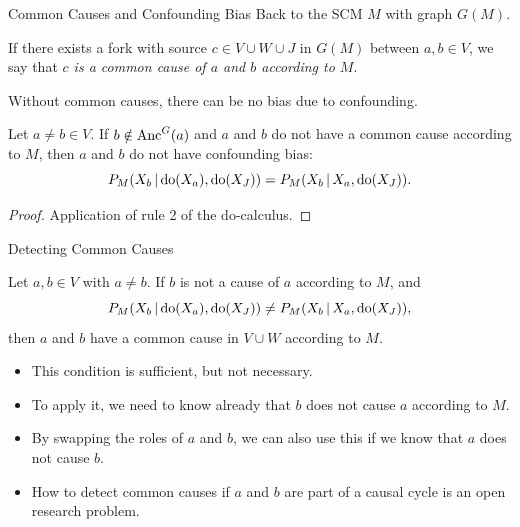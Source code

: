 \begin{frame}{Common Causes and Confounding Bias}
Back to the SCM $M$ with graph $G(M)$.
\begin{Def}
  If there exists a fork with source $c \in V \cup W \cup J$ in $G(M)$ between $a,b \in V$, we say that \emph{$c$ is a common cause of $a$ and $b$ according to $M$}.
\end{Def}
Without common causes, there can be no bias due to confounding.
\begin{Prp}\label{prp:scm_confounded_separation}
Let $a \ne b \in V$.
If $b \notin \mathrm{Anc}^G(a)$ and $a$ and $b$ do not have a common cause according to $M$, then
$a$ and $b$ do not have confounding bias:
  $$P_{M}(X_b \operatorname*{|} \operatorname{do}(X_a), \operatorname{do}(X_J)) = P_{M}(X_b \operatorname*{|} X_a, \operatorname{do}(X_J)).$$
\end{Prp}
\begin{proof}
Application of rule 2 of the do-calculus.
\end{proof}
\end{frame}

\begin{frame}{Detecting Common Causes}
\begin{Cor}
Let $a, b \in V$ with $a \ne b$.
If $b$ is not a cause of $a$ according to $M$, and
  $$P_{M}(X_b \operatorname*{|} \operatorname{do}(X_a), \operatorname{do}(X_J)) \ne P_{M}(X_b \operatorname*{|} X_a, \operatorname{do}(X_J)),$$
then $a$ and $b$ have a common cause in $V \cup W$ according to $M$.
\end{Cor}
  \begin{itemize}
    \item This condition is sufficient, but not necessary.
    \item To apply it, we need to know already that $b$ does not cause $a$ according to $M$.
    \item By swapping the roles of $a$ and $b$, we can also use this if we know that $a$ does not cause $b$.
    \item How to detect common causes if $a$ and $b$ are part of a causal cycle is an open research problem.
  \end{itemize}
\end{frame}

